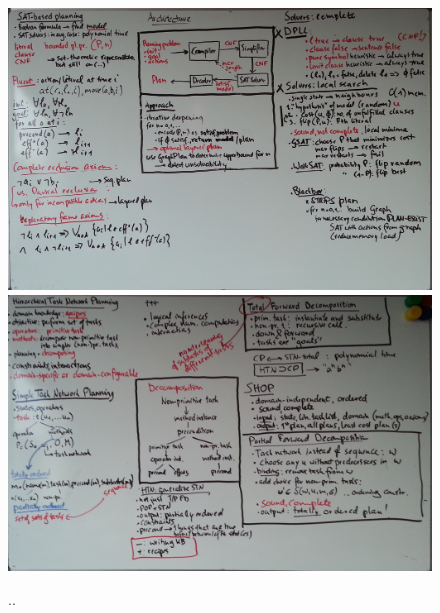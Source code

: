 \documentclass[a4paper,11pt,notitlepage]{article}
\begin{document}
\begin{figure}[ht!]
\centering
\includegraphics[width=180mm]{img/8.jpg}
\includegraphics[width=180mm]{img/9.jpg}
\caption{..}
\label{ideas}
\end{figure}
\end{document}
